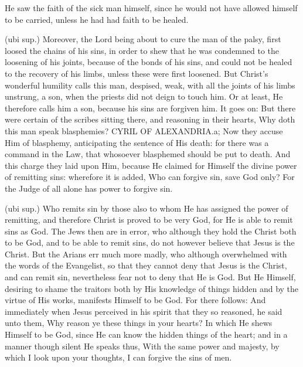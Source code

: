  He saw the faith of the sick man himself, since he would not have allowed himself to be carried, unless he had had faith to be healed.

 (ubi sup.) Moreover, the Lord being about to cure the man of the palsy, first loosed the chains of his sins, in order to shew that he was condemned to the loosening of his joints, because of the bonds of his sins, and could not be healed to the recovery of his limbs, unless these were first loosened. But Christ’s wonderful humility calls this man, despised, weak, with all the joints of his limbs unstrung, a son, when the priests did not deign to touch him. Or at least, He therefore calls him a son, because his sins are forgiven him. It goes on: But there were certain of the scribes sitting there, and reasoning in their hearts, Why doth this man speak blasphemies? CYRIL OF ALEXANDRIA.a; Now they accuse Him of blasphemy, anticipating the sentence of His death: for there was a command in the Law, that whosoever blasphemed should be put to death. And this charge they laid upon Him, because He claimed for Himself the divine power of remitting sins: wherefore it is added, Who can forgive sin, save God only? For the Judge of all alone has power to forgive sin.

 (ubi sup.) Who remits sin by those also to whom He has assigned the power of remitting, and therefore Christ is proved to be very God, for He is able to remit sins as God. The Jews then are in error, who although they hold the Christ both to be God, and to be able to remit sins, do not however believe that Jesus is the Christ. But the Arians err much more madly, who although overwhelmed with the words of the Evangelist, so that they cannot deny that Jesus is the Christ, and can remit sin, nevertheless fear not to deny that He is God. But He Himself, desiring to shame the traitors both by His knowledge of things hidden and by the virtue of His works, manifests Himself to be God. For there follows: And immediately when Jesus perceived in his spirit that they so reasoned, he said unto them, Why reason ye these things in your hearts? In which He shews Himself to be God, since He can know the hidden things of the heart; and in a manner though silent He speaks thus, With the same power and majesty, by which I look upon your thoughts, I can forgive the sins of men.


